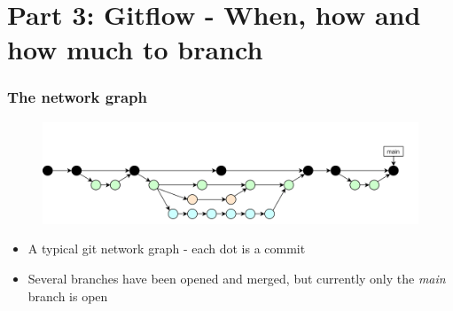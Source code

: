 \documentclass[aspectratio=169]{beamer} %
\begin{document}
\section{Part 3: \newline Gitflow - When, how and how much to branch}

\begin{frame}
	\frametitle{The network graph}

	\vspace{-.5cm}
	\begin{minipage}[t][5cm][t]{\textwidth}
		\begin{figure}
			\centering
			\includegraphics[width=\textwidth]{./img/dime-gitflow-network.png}
		\end{figure}
	\end{minipage}

	\vspace{-.5cm}
	\begin{minipage}[t][5cm][t]{\textwidth}
		\begin{itemize}
			\setlength\itemsep{.5em}
			\item A typical git network graph - each dot is a commit
			\item Several branches have been opened and merged,
			but currently only the \textit{main} branch is open
		\end{itemize}
	\end{minipage}

\end{frame}
\end{document}

